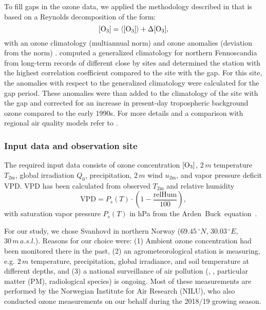 \documentclass[bg, manuscript]{copernicus}
\begin{document}
To fill gaps in the ozone data, we applied the methodology described in \citet{ACP:Falk2021} that is based on a Reynolds decomposition of the form:
\begin{equation}
  \chem{[O_3]} = \chem{\left<[O_3]\right>} + \chem{\Delta[O_3]},
  \label{eq:reynolds_decomp}
\end{equation}
with an ozone climatology (multiannual norm) \chem{\left<[O_3]\right>} and ozone anomalies (deviation from the norm) \chem{\Delta[O_3]}. \citet{ACP:Falk2021} computed a generalized climatology for northern Fennoscandia from long-term records of different close by sites and determined the station with the highest correlation coefficient compared to the site with the gap. For this site, the anomalies with respect to the generalized climatology were calculated for the gap period. These anomalies were than added to the climatology of the site with the gap and corrected for an increase in present-day tropospheric background ozone compared to the early 1990s. For more details and a comparison with regional air quality models refer to \citet{ACP:Falk2021}.

\subsubsection{Input data and observation site}
\label{subsec:data}
The required input data consists of ozone concentration $\chem{[O_3]}$, $2\,\unit{m}$ temperature $T_\mathrm{2m}$, global irradiation $Q_0$, precipitation, $2\,\unit{m}$ wind $u_\mathrm{2m}$, and vapor pressure deficit VPD. VPD has been calculated from observed $T_\mathrm{2m}$ and relative humidity
\begin{equation}
  \mathrm{VPD} = P_s(T) \cdot \left(1-\frac{\mathrm{relHum}}{100}\right),
\end{equation}
with saturation vapor pressure $P_s(T)$ in \unit{hPa} from the Arden~Buck~equation~\citep{JAP:Buck1981, Buck2012}.
 
For our study, we chose Svanhovd in northern Norway ($69.45\,\unit{^\circ N}$, $30.03\,\unit{^\circ E}$, $30\,\unit{m\,a.s.l.}$). Reasons for our choice were: (1) Ambient ozone concentration had been monitored there in the past, (2) an agrometeorological station is measuring, e.g. $2\,\unit{m}$ temperature, precipitation, global irradiance, and soil temperature at different depths, and (3) a national surveillance of air pollution (, , particular matter (PM), radiological species) is ongoing. Most of these measurements are performed by the Norwegian Institute for Air Research (NILU), who also conducted ozone measurements on our behalf during the 2018/19 growing season. 
\end{document}
